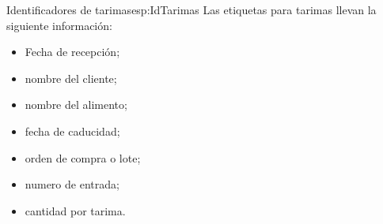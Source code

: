 \begin{nota}{Identificadores de tarimas}{esp:IdTarimas}
    Las etiquetas para tarimas llevan la siguiente información:
        \begin{itemize}
            \item Fecha de recepción;
            \item nombre del cliente;
            \item nombre del alimento;
            \item fecha de caducidad;
            \item orden de compra o lote;
            \item numero de entrada;
            \item cantidad por tarima.
        \end{itemize}
\end{nota}